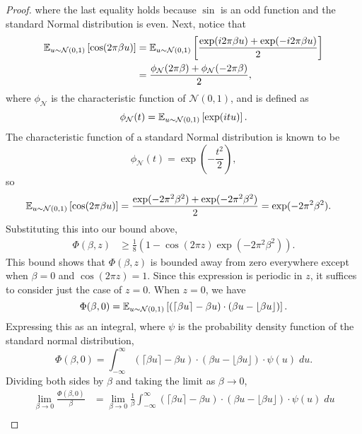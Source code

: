 \begin{proof}
  where the last equality holds because $\sin$ is an odd function and the standard Normal distribution is even.
  Next, notice that
  \begin{align*}
    \mathbb{E}_{u \sim \mathcal{N}(0,1)}\left[  \cos(2 \pi \beta u)  \right]
    &= 
    \mathbb{E}_{u \sim \mathcal{N}(0,1)}\left[  \frac{ \exp(i 2 \pi \beta u) +  \exp(-i 2 \pi \beta u) }{2}  \right] \\
    &=
    \frac{ \phi_{\mathcal{N}}(2 \pi \beta) + \phi_{\mathcal{N}}(-2 \pi \beta)}{2},
  \end{align*}
  where $\phi_{\mathcal{N}}$ is the characteristic function of $\mathcal{N}(0,1)$, and is defined as
  \[
    \phi_{\mathcal{N}}(t) = \mathbb{E}_{u \sim \mathcal{N}(0,1)}\left[  \exp(i t u)  \right].
  \]
  The characteristic function of a standard Normal distribution is known to be
  \[
    \phi_{\mathcal{N}}(t) = \exp\left(-\frac{t^2}{2}\right),
  \]
  so
  \begin{align*}
    \mathbb{E}_{u \sim \mathcal{N}(0,1)}\left[  \cos(2 \pi \beta u)  \right]
    &=
    \frac{ \exp(-2 \pi^2 \beta^2) + \exp(-2 \pi^2 \beta^2)}{2}
    =
    \exp(-2 \pi^2 \beta^2).
  \end{align*}
  Substituting this into our bound above,
  \begin{align*}
    \Phi(\beta, z)
    &\ge
    \frac{1}{8} \left( 1 - \cos(2 \pi z) \exp(-2 \pi^2 \beta^2) \right).
  \end{align*}
  This bound shows that $\Phi(\beta, z)$ is bounded away from zero everywhere except when $\beta = 0$ and $\cos(2 \pi z) = 1$.
  Since this expression is periodic in $z$, it suffices to consider just the case of $z = 0$.
  When $z = 0$, we have
  \[
    \Phi(\beta, 0)
    =
   \mathbb{E}_{u \sim \mathcal{N}(0,1)}\left[  \left( \lceil \beta u \rceil - \beta u \right) \cdot \left( \beta u - \lfloor \beta u \rfloor \right)  \right]. 
  \]
  Expressing this as an integral, where $\psi$ is the probability density function of the standard normal distribution,
  \[
    \Phi(\beta, 0)
    =
    \int_{-\infty}^{\infty}
    \left( \lceil \beta u \rceil - \beta u \right) \cdot \left( \beta u - \lfloor \beta u \rfloor \right)
    \cdot \psi(u) \; du.
  \]
  Dividing both sides by $\beta$ and taking the limit as $\beta \rightarrow 0$,
  \begin{align*}
    \lim_{\beta \rightarrow 0}
    \frac{\Phi(\beta, 0)}{\beta}
    &=
    \lim_{\beta \rightarrow 0}
    \frac{1}{\beta}
    \int_{-\infty}^{\infty}
    \left( \lceil \beta u \rceil - \beta u \right) \cdot \left( \beta u - \lfloor \beta u \rfloor \right)
    \cdot \psi(u) \; du \\

\end{align*}
\end{proof}

